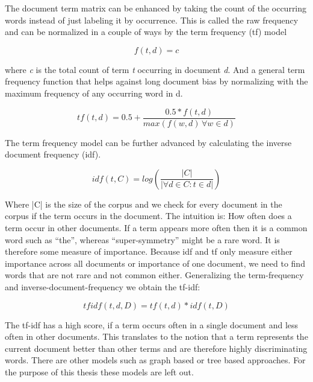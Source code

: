     The document term matrix can be enhanced by taking the count of the occurring words instead of just labeling it by occurrence. This is called the raw frequency and can be normalized in a couple of ways by the term frequency (tf) model
     
      \begin{equation}
        f(t,d) = c
      \end{equation}

    where \emph{c} is the total count of term \emph{t} occurring in document \emph{d}.
    And a general term frequency function that helps against long document bias by normalizing with the maximum frequency of any occurring word in d.

    \begin{equation}
      tf(t,d) = 0.5 + \frac{0.5 * f(t,d)}{max(f(w,d)\, \forall w \in d)}
    \end{equation}

    The term frequency model can be further advanced by calculating the inverse document frequency (idf).

    \begin{equation}
      idf(t, C) = log(\frac{|C|}{|\forall d \in C : t \in d|})
    \end{equation}

    Where |C| is the size of the corpus and we check for every document in the corpus if the term occurs in the document. The intuition is: How often does a term occur in other documents. If a term appears more often then it is a common word such as ``the'', whereas ``super-symmetry'' might be a rare word. It is therefore some measure of importance. Because idf and tf only measure either importance across all documents or importance of one document, we need to find words that are not rare and not common either. Generalizing the term-frequency and inverse-document-frequency we obtain the tf-idf:

    \begin{equation}
      tfidf(t, d, D) = tf(t, d) * idf(t, D)
    \end{equation}

    The tf-idf has a high score, if a term occurs often in a single document and less often in other documents. This translates to the notion that a term represents the current document better than other terms and are therefore highly discriminating words. There are other models such as graph based or tree based approaches. For the purpose of this thesis these models are left out. \cite[chp. 6]{IRBook2008}\\

